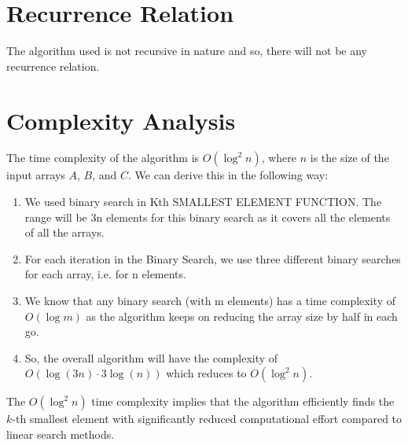 \documentclass{article}
\begin{document}
\section{Recurrence Relation}
The algorithm used is not recursive in nature and so, there will not be any recurrence relation.


\section{Complexity Analysis}
The time complexity of the algorithm is $O(\log^2 n)$, where $n$ is the size of the input arrays $A$, $B$, and $C$. We can derive this in the following way:
\begin{enumerate}
    \item We used binary search in Kth SMALLEST ELEMENT FUNCTION. The range will be 3n elements for this binary search as it covers all the elements of all the arrays.
    \item For each iteration in the Binary Search, we use three different binary searches for each array, i.e. for n elements.
    \item We know that any binary search (with m elements) has a time complexity of $O(\log m)$ as the algorithm keeps on reducing the array size by half in each go.
    \item So, the overall algorithm will have the complexity of $O(\log(3n) \cdot 3 \log(n))$ which reduces to  $O(\log^2 n)$.
\end{enumerate}
The $O(\log^2 n)$ time complexity implies that the algorithm efficiently finds the $k$-th smallest element with significantly reduced computational effort compared to linear search methods.
\end{document}
